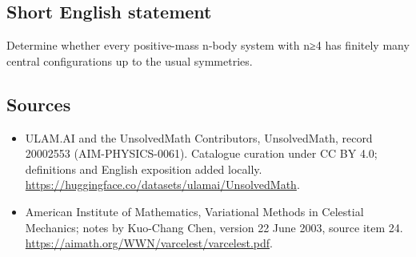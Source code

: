 \documentclass[11pt]{article}
\begin{document}
\subsection{Short English statement}
Determine whether every positive-mass n-body system with n≥4 has finitely many central configurations up to the usual symmetries.
\subsection{Sources}
\begin{itemize}
\item[\hypertarget{source:20002553:1}{S1}] ULAM.AI and the UnsolvedMath Contributors, UnsolvedMath, record 20002553 (AIM-PHYSICS-0061). Catalogue curation under CC BY 4.0; definitions and English exposition added locally.
\url{https://huggingface.co/datasets/ulamai/UnsolvedMath}.
\item[\hypertarget{source:20002553:2}{S2}] American Institute of Mathematics, Variational Methods in Celestial Mechanics; notes by Kuo-Chang Chen, version 22 June 2003, source item 24.
\url{https://aimath.org/WWN/varcelest/varcelest.pdf}.
\end{itemize}
\label{end:20002553}
\end{document}
